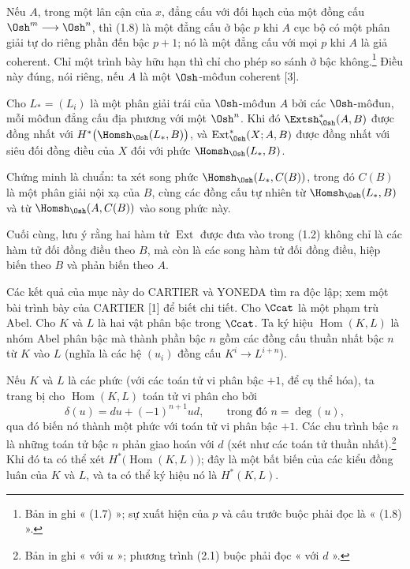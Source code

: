  Nếu $A$, trong một lân cận của $x$, đẳng cấu với
đối hạch của một đồng cấu $\Osh^{m}\longrightarrow\Osh^{n}$, thì (1.8) là một đẳng cấu ở bậc $p$ khi $A$ cục bộ có một phân giải tự do riêng phần đến bậc $p+1$; nó là một đẳng cấu với mọi $p$ khi $A$ là giả coherent. Chỉ một trình bày hữu hạn thì chỉ cho phép so sánh ở bậc không.\footnote{Bản in ghi « (1.7) »; sự
xuất hiện của $p$ và câu trước buộc phải đọc là « (1.8) ».}
Điều này đúng,
nói riêng, nếu $A$ là một $\Osh$-môđun coherent [3].

 Cho $L_{*}=(L_i)$ là một phân giải trái của
$\Osh$-môđun $A$ bởi các $\Osh$-môđun, mỗi môđun đẳng cấu địa phương với
một $\Osh^{n}$. Khi đó $\Extsh_{\Osh}^{*}(A,B)$ được đồng nhất với
$H^{*}\bigl(\Homsh_{\Osh}(L_{*},B)\bigr)$, và
$\operatorname{Ext}_{\Osh}^{*}(X;A,B)$ được đồng nhất với siêu đối đồng điều của $X$
đối với phức $\Homsh_{\Osh}(L_{*},B)$.

Chứng minh là chuẩn: ta xét song phức
$\Homsh_{\Osh}(L_{*},C(B))$, trong đó $C(B)$ là một phân giải nội xạ của $B$, cùng các
đồng cấu tự nhiên từ $\Homsh_{\Osh}(L_{*},B)$ và từ
$\Homsh_{\Osh}(A,C(B))$ vào song phức này.

Cuối cùng, lưu ý rằng hai hàm tử $\operatorname{Ext}$ được đưa vào
trong (1.2) không chỉ là các hàm tử đối đồng điều theo $B$, mà còn là các
song hàm tử đối đồng điều, hiệp biến theo $B$ và phản biến theo $A$.


Các kết quả của mục này do CARTIER và YONEDA tìm ra độc lập; xem
một bài trình bày của CARTIER [1] để biết chi tiết. Cho $\Ccat$ là một phạm trù Abel.
Cho $K$ và $L$ là hai vật phân bậc trong $\Ccat$. Ta ký hiệu
$\operatorname{Hom}(K,L)$ là nhóm Abel phân bậc mà thành phần bậc
$n$ gồm các đồng cấu thuần nhất bậc $n$ từ $K$ vào $L$ (nghĩa là
các hệ $(u_i)$ đồng cấu $K^{i}\longrightarrow L^{i+n}$).

Nếu $K$ và $L$ là các phức (với các toán tử vi phân bậc $+1$, để
cụ thể hóa), ta trang bị cho $\operatorname{Hom}(K,L)$ toán tử
vi phân cho bởi
\begin{equation}\tag{2.1}
  \delta(u)=du+(-1)^{n+1}ud,\qquad\text{trong đó }n=\deg(u),
\end{equation}
qua đó biến nó thành một phức với toán tử vi phân bậc $+1$. Các chu trình
bậc $n$ là những toán tử bậc $n$ phản giao hoán với $d$ (xét như
các toán tử thuần nhất).\footnote{Bản in ghi « với $u$ »; phương trình
(2.1) buộc phải đọc « với $d$ ».} Khi đó ta có thể xét
$H^{*}\bigl(\operatorname{Hom}(K,L)\bigr)$; đây là một bất biến của các kiểu
đồng luân của $K$ và $L$, và ta có thể ký hiệu nó là $H^{*}(K,L)$.

